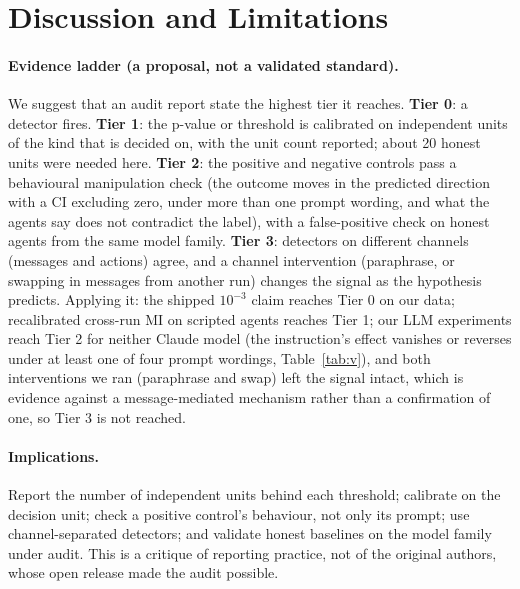 \documentclass[10pt]{article}
\begin{document}
\section{Discussion and Limitations}\label{sec:disc}
\paragraph{Evidence ladder (a proposal, not a validated standard).} We suggest that an audit report state the highest tier it reaches. \textbf{Tier 0}: a detector fires. \textbf{Tier 1}: the p-value or threshold is calibrated on independent units of the kind that is decided on, with the unit count reported; about 20 honest units were needed here. \textbf{Tier 2}: the positive and negative controls pass a behavioural manipulation check (the outcome moves in the predicted direction with a CI excluding zero, under more than one prompt wording, and what the agents say does not contradict the label), with a false-positive check on honest agents from the same model family. \textbf{Tier 3}: detectors on different channels (messages and actions) agree, and a channel intervention (paraphrase, or swapping in messages from another run) changes the signal as the hypothesis predicts. Applying it: the shipped $10^{-3}$ claim reaches Tier 0 on our data; recalibrated cross-run MI on scripted agents reaches Tier 1; our LLM experiments reach Tier 2 for neither Claude model (the instruction's effect vanishes or reverses under at least one of four prompt wordings, Table~\ref{tab:v}), and both interventions we ran (paraphrase and swap) left the signal intact, which is evidence against a message-mediated mechanism rather than a confirmation of one, so Tier 3 is not reached.

\paragraph{Implications.} Report the number of independent units behind each threshold; calibrate on the decision unit; check a positive control's behaviour, not only its prompt; use channel-separated detectors; and validate honest baselines on the model family under audit. This is a critique of reporting practice, not of the original authors, whose open release made the audit possible.
\end{document}

